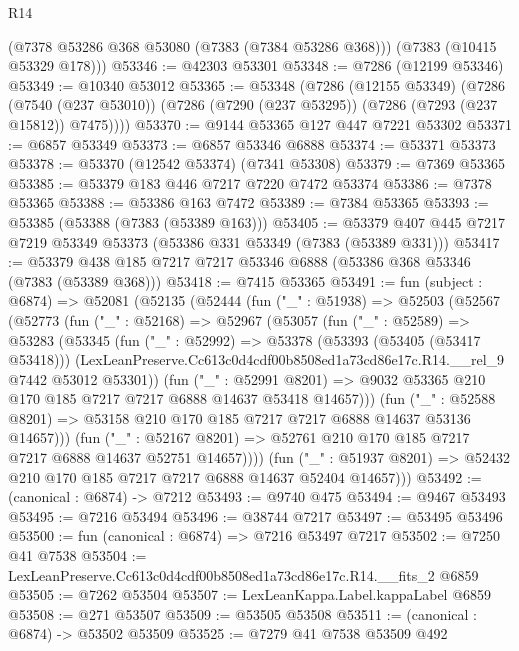 \begin{lexlean}{R14}
\begin{coremodule}
      (@7378 @53286 @368 @53080 (@7383 (@7384 @53286 @368)))
      (@7383 (@10415 @53329 @178)))
@53346 := @42303 @53301
@53348 := @7286 (@12199 @53346)
@53349 := @10340 @53012
@53365 := @53348
    (@7286
      (@12155 @53349)
      (@7286
        (@7540 (@237 @53010))
        (@7286 (@7290 (@237 @53295)) (@7286 (@7293 (@237 @15812)) @7475))))
@53370 := @9144 @53365 @127 @447 @7221 @53302
@53371 := @6857 @53349
@53373 := @6857 @53346 @6888
@53374 := @53371 @53373
@53378 := @53370 (@12542 @53374) (@7341 @53308)
@53379 := @7369 @53365
@53385 := @53379 @183 @446 @7217 @7220 @7472 @53374
@53386 := @7378 @53365
@53388 := @53386 @163 @7472
@53389 := @7384 @53365
@53393 := @53385 (@53388 (@7383 (@53389 @163)))
@53405 := @53379 @407 @445 @7217 @7219 @53349 @53373 (@53386 @331 @53349 (@7383 (@53389 @331)))
@53417 := @53379 @438 @185 @7217 @7217 @53346 @6888 (@53386 @368 @53346 (@7383 (@53389 @368)))
@53418 := @7415 @53365
@53491 := fun (subject : @6874) =>
  @52081
    (@52135
      (@52444
        (fun ("_" : @51938) =>
        @52503
          (@52567
            (@52773
              (fun ("_" : @52168) =>
              @52967
                (@53057
                  (fun ("_" : @52589) =>
                  @53283
                    (@53345
                      (fun ("_" : @52992) =>
                      @53378
                        (@53393 (@53405 (@53417 @53418)))
                        (LexLeanPreserve.Cc613c0d4cdf00b8508ed1a73cd86e17c.R14.__rel_9
                          @7442
                          @53012
                          @53301))
                      (fun ("_" : @52991 @8201) =>
                      @9032 @53365 @210 @170 @185 @7217 @7217 @6888 @14637 @53418 @14657)))
                  (fun ("_" : @52588 @8201) =>
                  @53158 @210 @170 @185 @7217 @7217 @6888 @14637 @53136 @14657)))
              (fun ("_" : @52167 @8201) =>
              @52761 @210 @170 @185 @7217 @7217 @6888 @14637 @52751 @14657))))
        (fun ("_" : @51937 @8201) => @52432 @210 @170 @185 @7217 @7217 @6888 @14637 @52404 @14657)))
@53492 := (canonical : @6874) -> @7212
@53493 := @9740 @475
@53494 := @9467 @53493
@53495 := @7216 @53494
@53496 := @38744 @7217
@53497 := @53495 @53496
@53500 := fun (canonical : @6874) => @7216 @53497 @7217
@53502 := @7250 @41 @7538
@53504 := LexLeanPreserve.Cc613c0d4cdf00b8508ed1a73cd86e17c.R14.__fits_2 @6859
@53505 := @7262 @53504
@53507 := LexLeanKappa.Label.kappaLabel @6859
@53508 := @271 @53507
@53509 := @53505 @53508
@53511 := (canonical : @6874) -> @53502 @53509
@53525 := @7279
    @41
    @7538
    @53509
    @492

\end{coremodule}
\end{lexlean}
